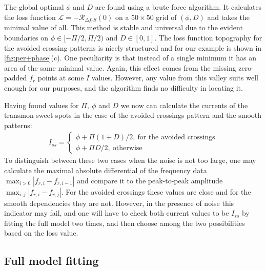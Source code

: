 \documentclass[%
 aip,
 draft,
 amsmath,amssymb,
 reprint,%
]{revtex4-1}
\begin{document}
The global optimal $\phi$ and $D$ are found using a brute force algorithm. It calculates the loss function $\mathcal{L} = - \mathcal{R}_{\Delta f_r S}(0)$ on a $50 \times 50$ grid of $(\phi, D)$ and takes the minimal value of all. This method is stable and universal due to the evident boundaries on $\phi \in [-\Pi/2,\Pi/2)$ and $D \in [0, 1]$. The loss function topography for the avoided crossing patterns is nicely structured and for our example is shown in \autoref{fig:per+phase}(c). One peculiarity is that instead of a single minimum it has an area of the same minimal value. Again, this effect comes from the missing zero-padded $f_r$ points at some $I$ values. However, any value from this valley suits well enough for our purposes, and the algorithm finds no difficulty in locating it.

Having found values for $\Pi,\ \phi$ and $D$ we now can calculate the currents of the transmon sweet spots in the case of the avoided crossings pattern and the smooth patterns:
\begin{align}
I_{ss} = 
\begin{cases}
 \phi + \Pi (1+D)/2,\ \text{for the avoided crossings}\\
 \phi + \Pi D/2 ,\ \text{otherwise}
\end{cases}
\end{align}
To distinguish between these two cases when the noise is not too large, one may calculate the maximal absolute differential of the frequency data $\max_{i>0} |f_{r,i} - f_{{r,i}-1}|$ and compare it to the peak-to-peak amplitude $\max_{i,j} | f_{r,i} - f_{r, j}|$. For the avoided crossings these values are close and for the smooth dependencies they are not. However, in the presence of noise this indicator may fail, and one will have to check both current values to be $I_{ss}$ by fitting the full model two times, and then choose among the two possibilities based on the loss value.


\subsection{Full model fitting}
\end{document}
